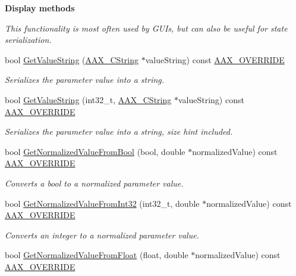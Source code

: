 \begin{Indent}\textbf{ Display methods}\par
{\em This functionality is most often used by G\+U\+Is, but can also be useful for state serialization. }\begin{DoxyCompactItemize}
\item 
bool \mbox{\hyperlink{a01541_ad5bdb6216462d9958da46b53ccf45351}{Get\+Value\+String}} (\mbox{\hyperlink{a01573}{A\+A\+X\+\_\+\+C\+String}} $\ast$value\+String) const \mbox{\hyperlink{a00392_ac2f24a5172689ae684344abdcce55463}{A\+A\+X\+\_\+\+O\+V\+E\+R\+R\+I\+DE}}
\begin{DoxyCompactList}\small\item\em Serializes the parameter value into a string. \end{DoxyCompactList}\item 
bool \mbox{\hyperlink{a01541_a3aaad9f8df319b7dd6c2934cd9d525b3}{Get\+Value\+String}} (int32\+\_\+t, \mbox{\hyperlink{a01573}{A\+A\+X\+\_\+\+C\+String}} $\ast$value\+String) const \mbox{\hyperlink{a00392_ac2f24a5172689ae684344abdcce55463}{A\+A\+X\+\_\+\+O\+V\+E\+R\+R\+I\+DE}}
\begin{DoxyCompactList}\small\item\em Serializes the parameter value into a string, size hint included. \end{DoxyCompactList}\item 
bool \mbox{\hyperlink{a01541_a4e6ba770bb335f45742d809a276bd0f8}{Get\+Normalized\+Value\+From\+Bool}} (bool, double $\ast$normalized\+Value) const \mbox{\hyperlink{a00392_ac2f24a5172689ae684344abdcce55463}{A\+A\+X\+\_\+\+O\+V\+E\+R\+R\+I\+DE}}
\begin{DoxyCompactList}\small\item\em Converts a bool to a normalized parameter value. \end{DoxyCompactList}\item 
bool \mbox{\hyperlink{a01541_a7e21ef2f06c332910c48b4c7dfcd91b4}{Get\+Normalized\+Value\+From\+Int32}} (int32\+\_\+t, double $\ast$normalized\+Value) const \mbox{\hyperlink{a00392_ac2f24a5172689ae684344abdcce55463}{A\+A\+X\+\_\+\+O\+V\+E\+R\+R\+I\+DE}}
\begin{DoxyCompactList}\small\item\em Converts an integer to a normalized parameter value. \end{DoxyCompactList}\item 
bool \mbox{\hyperlink{a01541_a9c7b59cf1f25b18fd8bf1c17dea75c31}{Get\+Normalized\+Value\+From\+Float}} (float, double $\ast$normalized\+Value) const \mbox{\hyperlink{a00392_ac2f24a5172689ae684344abdcce55463}{A\+A\+X\+\_\+\+O\+V\+E\+R\+R\+I\+DE}}

\end{DoxyCompactItemize}
\end{Indent}
